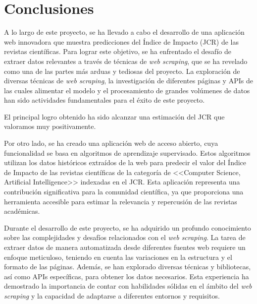 

\section{Conclusiones}

A lo largo de este proyecto, se ha llevado a cabo el desarrollo de una aplicación web innovadora que muestra predicciones del Índice de Impacto (JCR) de las revistas científicas. Para lograr este objetivo, se ha enfrentado el desafío de extraer datos relevantes a través de técnicas de \textit{web scraping}, que se ha revelado como una de las partes más arduas y tediosas del proyecto. La exploración de diversas técnicas de \textit{web scraping}, la investigación de diferentes páginas y APIs de las cuales alimentar el modelo y el procesamiento de grandes volúmenes de datos han sido actividades fundamentales para el éxito de este proyecto.

El principal logro obtenido ha sido alcanzar una estimación del JCR que valoramos muy positivamente.

Por otro lado, se ha creado una aplicación web de acceso abierto, cuya funcionalidad se basa en algoritmos de aprendizaje supervisado. Estos algoritmos utilizan los datos históricos extraídos de la web para predecir el valor del Índice de Impacto de las revistas científicas de la categoría de <<Computer Science, Artificial Intelligence>> indexadas en el JCR. Esta aplicación representa una contribución significativa para la comunidad científica, ya que proporciona una herramienta accesible para estimar la relevancia y repercusión de las revistas académicas.

Durante el desarrollo de este proyecto, se ha adquirido un profundo conocimiento sobre las complejidades y desafíos relacionados con el \textit{web scraping}. La tarea de extraer datos de manera automatizada desde diferentes fuentes web requiere un enfoque meticuloso, teniendo en cuenta las variaciones en la estructura y el formato de las páginas. Además, se han explorado diversas técnicas y bibliotecas, así como APIs específicas, para obtener los datos necesarios. Esta experiencia ha demostrado la importancia de contar con habilidades sólidas en el ámbito del \textit{web scraping} y la capacidad de adaptarse a diferentes entornos y requisitos.

